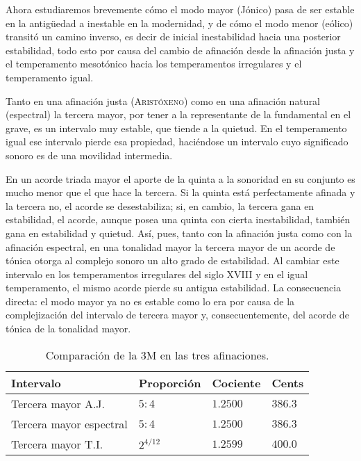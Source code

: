 \documentclass[a4paper,10pt]{article}
\begin{document}
\begin{multicols}{2}
  Ahora estudiaremos brevemente cómo el modo mayor (Jónico) pasa de ser estable en la antigüedad a inestable en la modernidad, y de cómo el modo menor (eólico) transitó un camino inverso, es decir de inicial inestabilidad hacia una posterior estabilidad, todo esto por causa del cambio de afinación desde la afinación justa y el temperamento mesotónico hacia los temperamentos irregulares y el temperamento igual.

  Tanto en una afinación justa (\textsc{Aristóxeno}) como en una afinación natural (espectral) la tercera mayor, por tener a la representante de la fundamental en el grave, es un intervalo muy estable, que tiende a la quietud. En el temperamento igual ese intervalo pierde esa propiedad, haciéndose un intervalo cuyo significado sonoro es de una movilidad intermedia.

  En un acorde triada mayor el aporte de la quinta a la sonoridad en su conjunto es mucho menor que el que hace la tercera. Si la quinta está perfectamente afinada y la tercera no, el acorde se desestabiliza; si, en cambio, la tercera gana en estabilidad, el acorde, aunque posea una quinta con cierta inestabilidad, también gana en estabilidad y quietud. Así, pues, tanto con la afinación justa como con la afinación espectral, en una tonalidad mayor la tercera mayor de un acorde de tónica otorga al complejo sonoro un alto grado de estabilidad. Al cambiar este intervalo en los temperamentos irregulares del siglo XVIII y en el igual temperamento, el mismo acorde pierde su antigua estabilidad. La consecuencia directa: el modo mayor ya no es estable como lo era por causa de la complejización del intervalo de tercera mayor y, consecuentemente, del acorde de tónica de la tonalidad mayor.
\end{multicols}

\begin{table}[ht]
  \centering
  \caption{Comparación de la 3M en las tres afinaciones.}\label{tab:3M}
  \begin{tabular}{@{}llll@{}}
  \toprule
  Intervalo               & Proporción  & Cociente  & Cents   \\ \midrule
  Tercera mayor A.J.      & $5:4$       & $1.2500$  & $386.3$ \\
  Tercera mayor espectral & $5:4$       & $1.2500$  & $386.3$ \\
  Tercera mayor T.I.      & $2^{4/12}$  & $1.2599$  & $400.0$ \\ \bottomrule
  \end{tabular}
\end{table}
\end{document}
